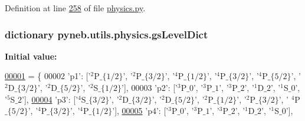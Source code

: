 Definition at line \hyperlink{physics_8py_source_l00258}{258} of file \hyperlink{physics_8py_source}{physics.\-py}.

\hypertarget{namespacepyneb_1_1utils_1_1physics_a18b749f74e825f8a60744ecba2078ce2}{
\subsubsection[{gs\-Level\-Dict}]{\setlength{\rightskip}{0pt plus 5cm}dictionary pyneb.\-utils.\-physics.\-gs\-Level\-Dict}}\label{namespacepyneb_1_1utils_1_1physics_a18b749f74e825f8a60744ecba2078ce2}
{\bfseries Initial value\-:}
\begin{DoxyCode}
\hypertarget{namespacepyneb_1_1utils_1_1physics_l00001}{}\hyperlink{namespacepyneb_1_1utils_1_1physics}{00001} = \{
00002             \textcolor{stringliteral}{'p1'}: [\textcolor{stringliteral}{'$^2$P$\_\{1/2\}$'}, \textcolor{stringliteral}{'$^2$P$\_\{3/2\}$'}, \textcolor{stringliteral}{'$^4$P$\_\{1/2\}$'}, \textcolor{stringliteral}{'$^4$P$\_\{3/2\}$'}, \textcolor{stringliteral}{'$^4$P$\_\{5/2\}$'}, \textcolor{stringliteral}{'
      $^2$D$\_\{3/2\}$'}, \textcolor{stringliteral}{'$^2$D$\_\{5/2\}$'}, \textcolor{stringliteral}{'$^2$S$\_\{1/2\}$'}],
00003             \textcolor{stringliteral}{'p2'}: [\textcolor{stringliteral}{'$^3$P$\_0$'}, \textcolor{stringliteral}{'$^3$P$\_1$'}, \textcolor{stringliteral}{'$^3$P$\_2$'}, \textcolor{stringliteral}{'$^1$D$\_2$'}, \textcolor{stringliteral}{'$^1$S$\_0$'}, \textcolor{stringliteral}{'$^5$S$\_2$'}],
\hypertarget{namespacepyneb_1_1utils_1_1physics_l00004}{}\hyperlink{classpyneb_1_1utils_1_1physics_1_1_c_s_t}{00004}             \textcolor{stringliteral}{'p3'}: [\textcolor{stringliteral}{'$^4$S$\_\{3/2\}$'}, \textcolor{stringliteral}{'$^2$D$\_\{3/2\}$'}, \textcolor{stringliteral}{'$^2$D$\_\{5/2\}$'}, \textcolor{stringliteral}{'$^2$P$\_\{1/2\}$'}, \textcolor{stringliteral}{'$^2$P$\_\{3/2\}$'}, \textcolor{stringliteral}{'
      $^4$P$\_\{5/2\}$'}, \textcolor{stringliteral}{'$^4$P$\_\{3/2\}$'}, \textcolor{stringliteral}{'$^4$P$\_\{1/2\}$'}],
\hypertarget{namespacepyneb_1_1utils_1_1physics_l00005}{}\hyperlink{classpyneb_1_1utils_1_1physics_1_1_c_s_t_aee0d21a1f9edd72e75c5369bd5bc36b9}{00005}             \textcolor{stringliteral}{'p4'}: [\textcolor{stringliteral}{'$^3$P$\_0$'}, \textcolor{stringliteral}{'$^3$P$\_1$'}, \textcolor{stringliteral}{'$^3$P$\_2$'}, \textcolor{stringliteral}{'$^1$D$\_2$'}, \textcolor{stringliteral}{'$^1$S$\_0$'}],

\end{DoxyCode}
